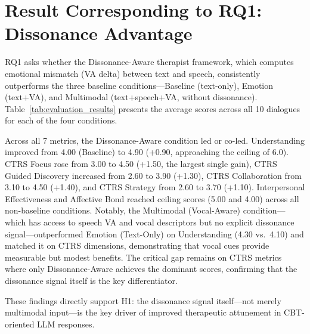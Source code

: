 \section{Result Corresponding to RQ1: Dissonance Advantage}

RQ1 asks whether the Dissonance-Aware therapist framework, which computes emotional mismatch (VA delta) between text and speech, consistently outperforms the three baseline conditions---Baseline (text-only), Emotion (text+VA), and Multimodal (text+speech+VA, without dissonance). Table~\ref{tab:evaluation_results} presents the average scores across all 10 dialogues for each of the four conditions.

Across all 7 metrics, the Dissonance-Aware condition led or co-led. Understanding improved from 4.00 (Baseline) to 4.90 (+0.90, approaching the ceiling of 6.0). CTRS Focus rose from 3.00 to 4.50 (+1.50, the largest single gain), CTRS Guided Discovery increased from 2.60 to 3.90 (+1.30), CTRS Collaboration from 3.10 to 4.50 (+1.40), and CTRS Strategy from 2.60 to 3.70 (+1.10). Interpersonal Effectiveness and Affective Bond reached ceiling scores (5.00 and 4.00) across all non-baseline conditions. Notably, the Multimodal (Vocal-Aware) condition---which has access to speech VA and vocal descriptors but no explicit dissonance signal---outperformed Emotion (Text-Only) on Understanding (4.30 vs.\ 4.10) and matched it on CTRS dimensions, demonstrating that vocal cues provide measurable but modest benefits. The critical gap remains on CTRS metrics where only Dissonance-Aware achieves the dominant scores, confirming that the dissonance signal itself is the key differentiator.

These findings directly support H1: the dissonance signal itself---not merely multimodal input---is the key driver of improved therapeutic attunement in CBT-oriented LLM responses.

\begin{table}[hbt!]
\caption{Average evaluation scores across 10 dialogues comparing 4 therapist generation methods (GPT-4o as judge)}
\label{tab:evaluation_results}
\end{table}

